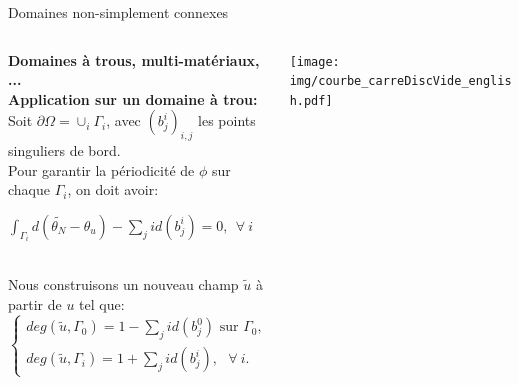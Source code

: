 \begin{frame}{Domaines non-simplement connexes}{}
\small
\vspace{-0.4cm}
\begin{columns}
\begin{column}{0.65\textwidth}
{\bf \color{onera_gray} Domaines à trous, multi-matériaux, ... }\\
\vspace{0.1cm}
\textbf{Application sur un domaine à trou:}\\
\vspace{0.1cm}
Soit $\partial\Omega=\cup_i\Gamma_i$, avec $(b_j^i)_{i,j}$ les points singuliers de bord.\\
\vspace{0.1cm}
\vspace{0.2cm}
Pour garantir la périodicité de $\phi$ sur chaque $\Gamma_i$, on doit avoir:\vspace{0.02cm}
\begin{center}
    $\int_{\Gamma_i}d(\widetilde{\theta_N}-\theta_u)-\sum_jid(b_j^i)=0,~~\forall~i$
\end{center}
\\[-0.1cm]
Nous construisons un nouveau champ $\widetilde{u}$ à partir de $u$ tel que:\vspace{-0.1cm}
\begin{equation*}
\begin{cases}
   deg(\widetilde{u},\Gamma_0)=1-\sum_j id(b_j^0)\mbox{ sur }\Gamma_0,\\[0.1cm]
   deg(\widetilde{u}, \Gamma_i)=1+\sum_j id(b_j^i),~~~\forall~i.
\end{cases}
\end{equation*}
\end{column}
\begin{column}{0.35\textwidth}
\centering
\texttt{[image: img/courbe\_carreDiscVide\_english.pdf]}
\end{column}
\end{columns}
\end{frame}

